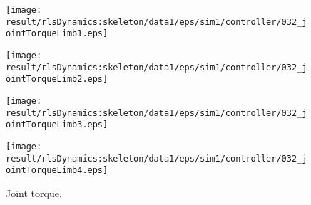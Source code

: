 \begin{figure}[h]
\centering
\begin{minipage}{0.240000\linewidth}
\centering
\texttt{[image: \\result/rlsDynamics:skeleton/data1/eps/sim1/controller/032\_jointTorqueLimb1.eps]}
\par\footnotesize{}
\end{minipage}
\begin{minipage}{0.240000\linewidth}
\centering
\texttt{[image: \\result/rlsDynamics:skeleton/data1/eps/sim1/controller/032\_jointTorqueLimb2.eps]}
\par\footnotesize{}
\end{minipage}
\begin{minipage}{0.240000\linewidth}
\centering
\texttt{[image: \\result/rlsDynamics:skeleton/data1/eps/sim1/controller/032\_jointTorqueLimb3.eps]}
\par\footnotesize{}
\end{minipage}
\begin{minipage}{0.240000\linewidth}
\centering
\texttt{[image: \\result/rlsDynamics:skeleton/data1/eps/sim1/controller/032\_jointTorqueLimb4.eps]}
\par\footnotesize{}
\end{minipage}

\caption{Joint torque.}
\end{figure}
